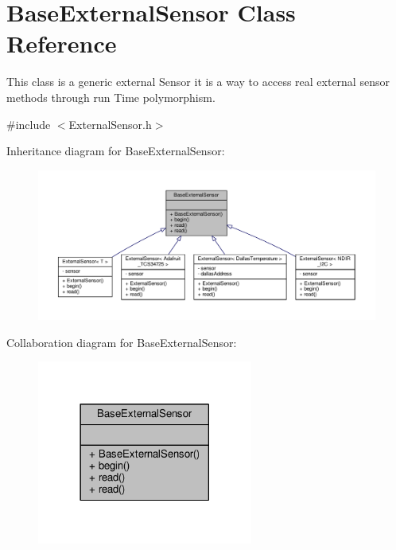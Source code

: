 \hypertarget{class_base_external_sensor}{}\section{Base\+External\+Sensor Class Reference}
\label{class_base_external_sensor}


This class is a generic external Sensor it is a way to access real external sensor methods through run Time polymorphism.  




{\ttfamily \#include $<$External\+Sensor.\+h$>$}



Inheritance diagram for Base\+External\+Sensor\+:
\nopagebreak
\begin{figure}[H]
\begin{center}
\leavevmode
\includegraphics[width=350pt]{d5/d26/class_base_external_sensor__inherit__graph}
\end{center}
\end{figure}


Collaboration diagram for Base\+External\+Sensor\+:
\nopagebreak
\begin{figure}[H]
\begin{center}
\leavevmode
\includegraphics[width=201pt]{d4/dc4/class_base_external_sensor__coll__graph}
\end{center}
\end{figure}
